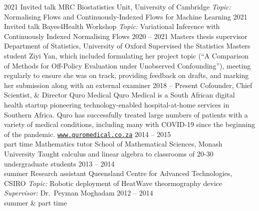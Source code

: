 \documentclass[9pt]{developercv} %
\begin{document}
\begin{entrylist}
    \entry
        {2021}%
        {Invited talk}
        {MRC Biostatistics Unit, University of Cambridge}
        {\textit{Topic:} Normalising Flows and Continuously-Indexed Flows for Machine Learning}
    \entry
        {2021}%
        {Invited talk}
        {Bayes4Health Workshop}
        {\textit{Topic:} Variational Inference with Continuously Indexed Normalising Flows}
    \entry
        {2020 -- 2021}%
        {Masters thesis supervisor}
        {Department of Statistics, University of Oxford}
        {Supervised the Statistics Masters student Ziyi Yan, which included formulating her project topic (``A Comparison of Methods for Off-Policy Evaluation under Unobserved Confounding''), meeting regularly to ensure she was on track, providing feedback on drafts, and marking her submission along with an external examiner}
    \entry
        {2018 -- Present}%
        {Cofounder, Chief Scientist, \& Director}
        {Quro Medical}
        {Quro Medical is a South African digital health startup pioneering technology-enabled hospital-at-home services in Southern Africa.
        Quro has successfully treated large numbers of patients with a variety of medical conditions, including many with COVID-19 since the beginning of the pandemic. \texttt{\href{https://www.quromedical.co.za}{www.quromedical.co.za}}}
    \entry
        {2014 -- 2015\\\footnotesize{part time}}
        {Mathematics tutor}
        {School of Mathematical Sciences, Monash University}
        {Taught calculus and linear algebra to classrooms of 20-30 undergraduate students}
    \entry
        {2013 -- 2014\\\footnotesize{summer}}
        {Research assistant}
        {Queensland Centre for Advanced Technologies, CSIRO}
        {\textit{Topic:} Robotic deployment of HeatWave theormography device\\
        \textit{Supervisor:} Dr.\ Peyman Moghadam}
    \entry
        {2012 -- 2014\\\footnotesize{summer \& part time}}

\end{entrylist}
\end{document}
